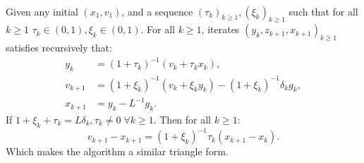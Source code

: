 \documentclass[12pt]{article}
\begin{document}
    \begin{proposition}\label{prop:abs-st-form}\;\\
        Given any initial $(x_1, v_1)$, and a sequence $(\tau_k)_{k \ge 1}, (\xi_k)_{k \ge 1}$ such that for all $k \ge 1$ $\tau_k \in (0, 1), \xi_k \in (0, 1)$. 
        For all $k\ge 1$, iterates $(y_k, z_{k + 1}, x_{k + 1})_{k \ge 1}$ satisfies recursively that: 
        \begin{align*}
            y_k &= (1 + \tau_k)^{-1}(v_k + \tau_k x_k),
            \\
            v_{k + 1} &= (1 + \xi_k)^{-1}(v_k + \xi_k y_k) - (1 + \xi_k)^{-1}\delta_k g_k,
            \\
            x_{k + 1} &= y_k - L^{-1} g_k. 
        \end{align*}
        If $1 + \xi_k + \tau_k = L\delta_k, \tau_k \neq 0\; \forall k \ge 1$. 
        Then for all $k \ge 1$: 
        $$
            v_{k + 1} - x_{k + 1} = (1 + \xi_k)^{-1}\tau_k(x_{k + 1} - x_k). 
        $$
        Which makes the algorithm a similar triangle form. 
    \end{proposition}
\end{document}
